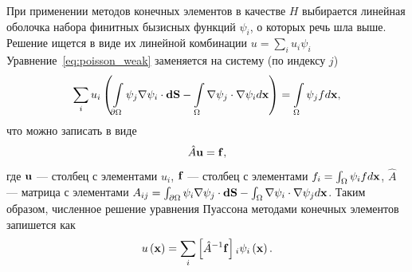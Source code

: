 \documentclass[oneside,final,12pt]{extreport}
\begin{document}
При применении методов конечных элементов в качестве $H$ выбирается линейная
оболочка набора финитных бызисных функций $\psi_i$, о которых речь шла выше.
Решение ищется в виде их линейной комбинации $u = \sum_i u_i\psi_i$
Уравнение~\eqref{eq:poisson_weak} заменяется на систему (по индексу $j$)
\begin{equation}
  \sum_i u_i \left(
    \int\limits_{\partial\Omega} \psi_j \nabla \psi_i \cdot \vb{dS} -
    \int\limits_\Omega \nabla\psi_j \cdot \nabla \psi_i d\vb x
  \right) =
  \int\limits_\Omega \psi_j f d\vb x,
\label{eq:poisson_FEM}
\end{equation}
что можно записать в виде
\begin{equation}
  \hat{A}\vb u = \vb f,
\label{eq:poisson_FEM_obscure}
\end{equation}
где $\vb u$ --- столбец с элементами $u_i$,
$\vb f$ --- столбец с элементами $f_i = \int_\Omega\psi_i f d\vb x$,
$\hat{A}$ --- матрица с элементами $A_{ij} =
  \int_{\partial\Omega} \psi_i \nabla \psi_j \cdot \vb{dS} -
    \int_\Omega \nabla\psi_i \cdot \nabla \psi_j d\vb x$.
Таким образом, численное решение уравнения Пуассона методами конечных элементов
запишется как
\begin{equation}
  u\left(\vb x\right) =
    \sum_i\left[\hat{A}^{-1}\vb f\right]{}_i\psi_i\left(\vb x\right).
\end{equation}
\end{document}
